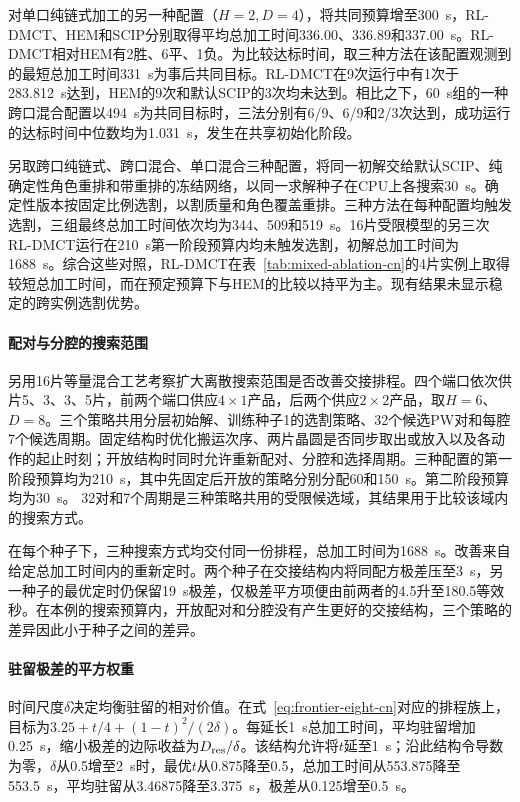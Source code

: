 \documentclass[final,5p,times,twocolumn]{elsarticle}
\begin{document}
对单口纯链式加工的另一种配置（$H=2,D=4$），将共同预算增至300~s，RL-DMCT、HEM和SCIP分别取得平均总加工时间336.00、336.89和337.00~s。RL-DMCT相对HEM有2胜、6平、1负。为比较达标时间，取三种方法在该配置观测到的最短总加工时间331~s为事后共同目标。RL-DMCT在9次运行中有1次于283.812~s达到，HEM的9次和默认SCIP的3次均未达到。相比之下，60~s组的一种跨口混合配置以494~s为共同目标时，三法分别有6/9、6/9和2/3次达到，成功运行的达标时间中位数均为1.031~s，发生在共享初始化阶段。

另取跨口纯链式、跨口混合、单口混合三种配置，将同一初解交给默认SCIP、纯确定性角色重排和带重排的冻结网络，以同一求解种子在CPU上各搜索30~s。确定性版本按固定比例选割，以割质量和角色覆盖重排。三种方法在每种配置均触发选割，三组最终总加工时间依次均为344、509和519~s。16片受限模型的另三次RL-DMCT运行在210~s第一阶段预算内均未触发选割，初解总加工时间为1688~s。综合这些对照，RL-DMCT在表~\ref{tab:mixed-ablation-cn}的4片实例上取得较短总加工时间，而在预定预算下与HEM的比较以持平为主。现有结果未显示稳定的跨实例选割优势。

\paragraph{配对与分腔的搜索范围}
另用16片等量混合工艺考察扩大离散搜索范围是否改善交接排程。四个端口依次供片5、3、3、5片，前两个端口供应$4\times1$产品，后两个供应$2\times2$产品，取$H=6$、$D=8$。三个策略共用分层初始解、训练种子1的选割策略、32个候选PW对和每腔7个候选周期。固定结构时优化搬运次序、两片晶圆是否同步取出或放入以及各动作的起止时刻；开放结构时同时允许重新配对、分腔和选择周期。三种配置的第一阶段预算均为210~s，其中先固定后开放的策略分别分配60和150~s。第二阶段预算均为30~s。 32对和7个周期是三种策略共用的受限候选域，其结果用于比较该域内的搜索方式。

在每个种子下，三种搜索方式均交付同一份排程，总加工时间为1688~s。改善来自给定总加工时间内的重新定时。两个种子在交接结构内将同配方极差压至3~s，另一种子的最优定时仍保留19~s极差，仅极差平方项便由前两者的4.5升至180.5等效秒。在本例的搜索预算内，开放配对和分腔没有产生更好的交接结构，三个策略的差异因此小于种子之间的差异。

\paragraph{驻留极差的平方权重}
时间尺度$\delta$决定均衡驻留的相对价值。在式~\eqref{eq:frontier-eight-cn}对应的排程族上，目标为$3.25+t/4+(1-t)^2/(2\delta)$。每延长1~s总加工时间，平均驻留增加0.25~s，缩小极差的边际收益为$D_{\rm res}/\delta$。该结构允许将$t$延至1~s；沿此结构令导数为零，$\delta$从0.5增至2~s时，最优$t$从0.875降至0.5，总加工时间从553.875降至553.5~s，平均驻留从3.46875降至3.375~s，极差从0.125增至0.5~s。
\end{document}
